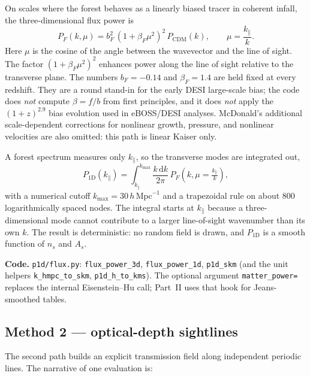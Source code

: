 \documentclass[11pt]{article}
\begin{document}
On scales where the forest behaves as a linearly biased tracer in coherent infall, the three-dimensional flux power is
\begin{equation}
P_F(k,\mu)=b_F^{2}\,(1+\beta_F\mu^{2})^{2}\,P_\mathrm{CDM}(k),\qquad
\mu=\frac{k_\parallel}{k}.
\end{equation}
Here $\mu$ is the cosine of the angle between the wavevector and the line of sight.
The factor $(1+\beta_F\mu^{2})^{2}$ enhances power along the line of sight relative to the transverse plane.
The numbers $b_F=-0.14$ and $\beta_F=1.4$ are held fixed at every redshift.
They are a round stand-in for the early DESI large-scale bias; the code does \emph{not} compute $\beta=f/b$ from first principles, and it does \emph{not} apply the $(1+z)^{2.9}$ bias evolution used in eBOSS/DESI analyses.
McDonald's additional scale-dependent corrections for nonlinear growth, pressure, and nonlinear velocities are also omitted: this path is linear Kaiser only.

A forest spectrum measures only $k_\parallel$, so the transverse modes are integrated out,
\begin{equation}
P_{1\mathrm{D}}(k_\parallel)
=
\int_{k_\parallel}^{k_\mathrm{max}}
\frac{k\,\mathrm{d}k}{2\pi}\,
P_F\!\left(k,\mu=\tfrac{k_\parallel}{k}\right),
\end{equation}
with a numerical cutoff $k_\mathrm{max}=30\,h\,\mathrm{Mpc}^{-1}$ and a trapezoidal rule on about 800 logarithmically spaced nodes.
The integral starts at $k_\parallel$ because a three-dimensional mode cannot contribute to a larger line-of-sight wavenumber than its own $k$.
The result is deterministic: no random field is drawn, and $P_{1\mathrm{D}}$ is a smooth function of $n_s$ and $A_s$.

\textbf{Code.}
\texttt{p1d/flux.py}:
\texttt{flux\_power\_3d}, \texttt{flux\_power\_1d}, \texttt{p1d\_skm}
(and the unit helpers \texttt{k\_hmpc\_to\_skm}, \texttt{p1d\_h\_to\_kms}).
The optional argument \texttt{matter\_power=} replaces the internal Eisenstein--Hu call; Part~II uses that hook for Jeans-smoothed tables.

\subsection{Method 2 --- optical-depth sightlines}

The second path builds an explicit transmission field along independent periodic lines.
The narrative of one evaluation is:
\end{document}

